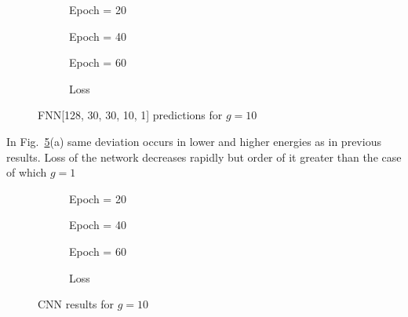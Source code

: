 \documentclass[a4paper,times,12pt]{article}
\begin{document}
\begin{figure}[H]
    \centering
    \begin{subfigure}[t]{0.45\textwidth}
		\centering
        
        \caption{Epoch = 20}
		\label{fig:a}
    \end{subfigure}
    \begin{subfigure}[t]{0.45\textwidth}
		\centering
        
        \caption{Epoch = 40}
		\label{fig:b}
    \end{subfigure}    
    \begin{subfigure}[t]{0.45\textwidth}
        \centering
        
        \caption{Epoch = 60}
		\label{fig:c}
    \end{subfigure}
    \begin{subfigure}[t]{0.45\textwidth}
        \centering
        
        \caption{Loss}
		\label{fig:c}
    \end{subfigure}
	\caption{FNN[128, 30, 30, 10, 1] predictions for $g = 10$}
\label{fig:FFN-g-10}
\end{figure}

In Fig.~\ref{fig:FFN-g-10}(a) same deviation occurs in lower and higher energies as in previous results. Loss of the network decreases rapidly but order of it greater than the case of which $g = 1$


\begin{figure}[H]
    \centering
    \begin{subfigure}[t]{0.45\textwidth}
		\centering
        
        \caption{Epoch = 20}
		\label{fig:a}
    \end{subfigure}
    \begin{subfigure}[t]{0.45\textwidth}
		\centering
        
        \caption{Epoch = 40}
		\label{fig:b}
    \end{subfigure}    
    \begin{subfigure}[t]{0.45\textwidth}
        \centering
        
        \caption{Epoch = 60}
		\label{fig:c}
    \end{subfigure}
    \begin{subfigure}[t]{0.45\textwidth}
        \centering
        
        \caption{Loss}
		\label{fig:c}
    \end{subfigure}
	\caption{CNN results for $g = 10$}
\label{fig:CNN-g-10}
\end{figure}
\end{document}
